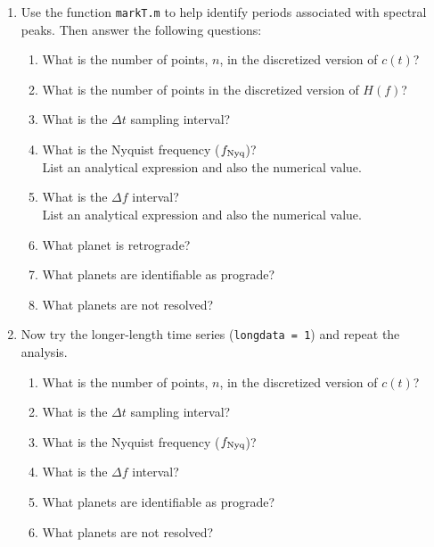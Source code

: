 \documentclass[11pt,titlepage,fleqn]{article}
\begin{document}
\begin{spacing}{2.0}
\begin{enumerate}

\item  Use the function \verb+markT.m+ to help identify periods associated with spectral peaks. Then answer the following questions:
%
\begin{enumerate}
\item What is the number of points, $n$, in the discretized version of $c(t)$?
\item What is the number of points in the discretized version of $H(f)$?
\item What is the $\Delta t$ sampling interval?
\item What is the Nyquist frequency ($f_{\rm Nyq}$)? \\
List an analytical expression and also the numerical value.
\item What is the $\Delta f$ interval? \\
List an analytical expression and also the numerical value.
\item What planet is retrograde?
\item What planets are identifiable as prograde?
\item What planets are not resolved?
\end{enumerate}

\item Now try the longer-length time series (\verb+longdata = 1+) and repeat the analysis.
%
\begin{enumerate}
\item What is the number of points, $n$, in the discretized version of $c(t)$?
\item What is the $\Delta t$ sampling interval?
\item What is the Nyquist frequency ($f_{\rm Nyq}$)?
\item What is the $\Delta f$ interval?
\item What planets are identifiable as prograde?
\item What planets are not resolved?
\end{enumerate}

\end{enumerate}

\end{spacing}

%
%

\end{document}
